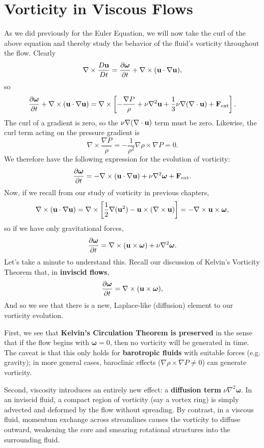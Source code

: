 \section{Vorticity in Viscous Flows}
As we did previously for the Euler Equation, we will now take the curl of the above equation and thereby study the behavior of the fluid's vorticity throughout the flow. Clearly
\[
\nabla \times \frac{D{\bf u}}{Dt} = \frac{\partial \boldsymbol{\omega}}{\partial t} + \nabla \times ({\bf u} \cdot \nabla {\bf u}),
\]
so
\[
\frac{\partial {\boldsymbol{\omega}}}{\partial t} + \nabla \times ({\bf u} \cdot \nabla {\bf u}) = \nabla \times \left[ -\frac{\nabla P}{\rho} + \nu \nabla^2 {\bf u} + \frac{1}{3}\nu \nabla(\nabla \cdot {\bf u}) + {\bf F}_{\rm ext}\right].
\]
The curl of a gradient is zero, so the $\nu \nabla(\nabla \cdot {\bf u})$ term must be zero. Likewise, the curl term acting on the pressure gradient is
\[
\nabla \times \frac{\nabla P}{\rho} = -\frac{1}{\rho^2} \nabla \rho \times \nabla P = 0.
\]
 We therefore have the following expression for the evolution of vorticity:
\[
\frac{\partial \boldsymbol{\omega}}{\partial t} = - \nabla \times ({\bf u}\cdot \nabla{\bf u}) + \nu \nabla^2\boldsymbol{\omega} + {\bf F}_{\rm ext}.
\]
Now, if we recall from our study of vorticity in previous chapters,
\[
\nabla \times ({\bf u} \cdot \nabla {\bf u}) = \nabla \times \left[\frac{1}{2}\nabla({\bf u}^2) - {\bf u} \times (\nabla \times {\bf u})\right] =-\nabla \times {\bf u} \times \boldsymbol{\omega},
\]
so if we have only gravitational forces,
\[
\frac{\partial \boldsymbol{\omega}}{\partial t} = \nabla \times({\bf u} \times \boldsymbol{\omega}) + \nu \nabla^2\boldsymbol{\omega}.
\]
Let's take a minute to understand this. Recall our discussion of Kelvin's Vorticity Theorem that, in \textbf{inviscid flows},
\[
\frac{\partial \boldsymbol{\omega}}{\partial t} = \nabla\times({\bf u} \times \boldsymbol{\omega}),
\]
And so we see that there is a new, Laplace-like (diffusion) element to our vorticity evolution.
\par
First, we see that \textbf{Kelvin's Circulation Theorem is preserved} in the sense that if the flow begins with 
$\boldsymbol{\omega} = 0$, then no vorticity will be generated in time. The caveat is that this only holds for 
\textbf{barotropic fluids} with suitable forces (e.g. gravity); in more general cases, baroclinic effects 
($\nabla \rho \times \nabla P \neq 0$) can generate vorticity.  
\par
Second, viscosity introduces an entirely new effect: a \textbf{diffusion term} 
$\nu \nabla^2 \boldsymbol{\omega}$. In an inviscid fluid, a compact region of vorticity (say a vortex ring) is 
simply advected and deformed by the flow without spreading. By contrast, in a viscous fluid, momentum exchange 
across streamlines causes the vorticity to diffuse outward, weakening the core and smearing rotational structures 
into the surrounding fluid.

